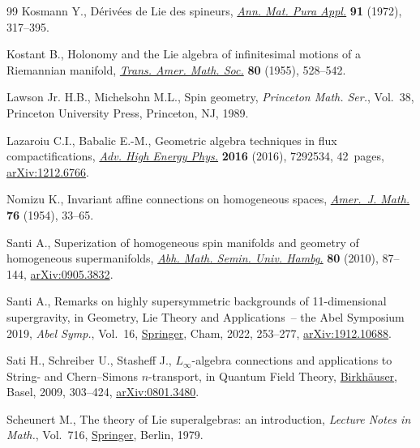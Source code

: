 \documentclass[11pt]{article}
\numberwithin{equation}{section}
\numberwithin{equation}{section}
\newcommand{\1}{\mathbbm{1}}
\begin{document}
\begin{thebibliography}{99}
Kosmann Y., D\'eriv\'ees de {L}ie des spineurs,
 \href{https://doi.org/10.1007/BF02428822}{\textit{Ann. Mat. Pura Appl.}}
 \textbf{91} (1972), 317--395.

Kostant B., Holonomy and the {L}ie algebra of infinitesimal motions of a
 {R}iemannian manifold, \href{https://doi.org/10.2307/1993001}{\textit{Trans.
 Amer. Math. Soc.}} \textbf{80} (1955), 528--542.

Lawson Jr. H.B., Michelsohn M.L., Spin geometry, \textit{Princeton Math. Ser.},
 Vol.~38, Princeton University Press, Princeton, NJ, 1989.

Lazaroiu C.I., Babalic E.-M., Geometric algebra techniques in flux
 compactifications, \href{https://doi.org/10.1155/2016/7292534}{\textit{Adv.
 High Energy Phys.}} \textbf{2016} (2016), 7292534, 42~pages,
 \href{http://arxiv.org/abs/1212.6766}{arXiv:1212.6766}.

Nomizu K., Invariant affine connections on homogeneous spaces,
 \href{https://doi.org/10.2307/2372398}{\textit{Amer.~J. Math.}} \textbf{76}
 (1954), 33--65.

Santi A., Superization of homogeneous spin manifolds and geometry of
 homogeneous supermanifolds,
 \href{https://doi.org/10.1007/s12188-009-0031-2}{\textit{Abh. Math. Semin.
 Univ. Hambg.}} \textbf{80} (2010), 87--144,
 \href{http://arxiv.org/abs/0905.3832}{arXiv:0905.3832}.

Santi A., Remarks on highly supersymmetric backgrounds of 11-dimensional
 supergravity, in Geometry, {L}ie {T}heory and {A}pplications~-- the {A}bel
 {S}ymposium 2019, \textit{Abel Symp.}, Vol.~16,
 \href{https://doi.org/10.1007/978-3-030-81296-6_12}{Springer}, Cham, 2022,
 253--277, \href{http://arxiv.org/abs/1912.10688}{arXiv:1912.10688}.

Sati H., Schreiber U., Stasheff J., {$L_\infty$}-algebra connections and
 applications to {S}tring- and {C}hern--{S}imons {$n$}-transport, in Quantum
 {F}ield {T}heory,
 \href{https://doi.org/10.1007/978-3-7643-8736-5_17}{Birkh\"auser}, Basel,
 2009, 303--424, \href{http://arxiv.org/abs/0801.3480}{arXiv:0801.3480}.

Scheunert M., The theory of {L}ie superalgebras: an introduction,
 \textit{Lecture Notes in Math.}, Vol.~716,
 \href{https://doi.org/10.1007/BFb0070929}{Springer}, Berlin, 1979.


\end{thebibliography}
\end{document}
